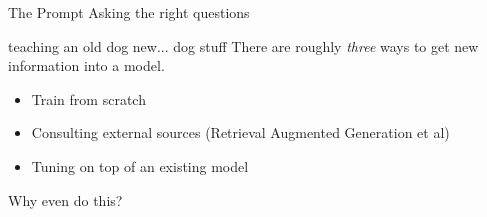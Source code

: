 \documentclass{beamer}
\begin{document}
\begin{frame}{The Prompt}
			Asking the right questions
\end{frame}

\begin{frame}[plain]
\end{frame}

\begin{frame}[plain]
\end{frame}


\begin{frame}{teaching an old dog new... dog stuff}
There are roughly \textit{three} ways to get new information into a model.
\begin{itemize}
	\pause
	\item Train from scratch
	\pause
	\item Consulting external sources (Retrieval Augmented Generation et al)
	\pause
	\item Tuning on top of an existing model
\end{itemize}
\end{frame}
	
	
	
\begin{frame}
	Why even do this?
\end{frame}
	
\end{document}
